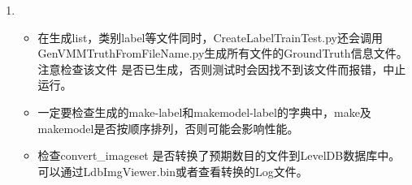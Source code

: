 \documentclass{article}
\begin{document}
\begin{CJK}{UTF8}{gbsn}
\begin{enumerate}
     \item \textbf{\color{red}{数据准备检查}}\\
               \begin{itemize}
               \item 在生成list，类别label等文件同时，CreateLabelTrainTest.py还会调用\\GenVMMTruthFromFileName.py生成所有文件的GroundTruth信息文件。
                     注意检查该文件 是否已生成，否则测试时会因找不到该文件而报错，中止运行。\\
               \item 一定要检查生成的make-label和makemodel-label的字典中，make及makemodel是否按顺序排列，否则可能会影响性能。
               \item 检查convert\_imageset 是否转换了预期数目的文件到LevelDB数据库中。可以通过LdbImgViewer.bin或者查看转换的Log文件。
               \end{itemize}
      

\end{enumerate}
\end{CJK}
\end{document}
